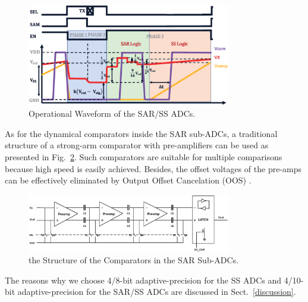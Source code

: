 \begin{figure}[htbp]
	\centerline{\includegraphics[width=3.5in]{./Figures/SARWAVE.eps}}
	\caption{Operational Waveform of the SAR/SS ADCs.}
	\label{SARWAVE}
\end{figure} 

As for the dynamical comparators inside the SAR sub-ADCs, a traditional structure of a strong-arm comparator with pre-amplifiers can be used as presented in Fig.~\ref{LATCH}. Such comparators 
are suitable for multiple comparisons because high speed is easily achieved. Besides, the offset voltages of the pre-amps can be effectively eliminated by Output Offset Cancelation (OOS) \cite{razavi_design_1992}.

\begin{figure}[htbp]
	\centerline{\includegraphics[width=3.5in]{./Figures/LATCH.eps}}
	\caption{the Structure of the Comparators in the SAR Sub-ADCs.}
	\label{LATCH}
\end{figure} 

The reasons why we choose 4/8-bit adaptive-precision for the SS ADCs and 4/10-bit adaptive-precision for the SAR/SS ADCs are discussed in Sect.~\ref{discussion}.
